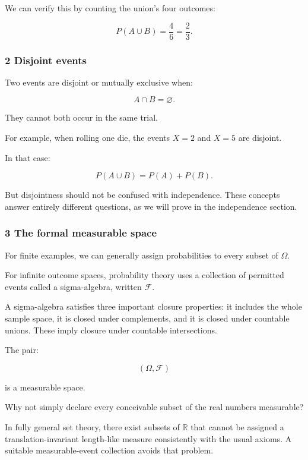 We can verify this by counting the union's four outcomes:

\[
 P(A\cup B)=\frac46=\frac23.
\]

\subsubsection{2 Disjoint events}\label{02-foundations-ii-ch023-disjoint-events}

\hypertarget{02-foundations-ii-ch023-disjoint-events}{}

Two events are disjoint or mutually exclusive when:

\[
 A\cap B=\varnothing.
\]

They cannot both occur in the same trial.

For example, when rolling one die, the events \(X=2\) and \(X=5\) are disjoint.

In that case:

\[
 P(A\cup B)=P(A)+P(B).
\]

But disjointness should not be confused with independence. These concepts answer entirely different questions, as we will prove in the independence section.

\subsubsection{3 The formal measurable space}\label{02-foundations-ii-ch023-the-formal-measurable-space}

\hypertarget{02-foundations-ii-ch023-the-formal-measurable-space}{}

For finite examples, we can generally assign probabilities to every subset of \(\Omega\).

For infinite outcome spaces, probability theory uses a collection of permitted events called a sigma-algebra, written \(\mathcal F\).

A sigma-algebra satisfies three important closure properties: it includes the whole sample space, it is closed under complements, and it is closed under countable unions. These imply closure under countable intersections.

The pair:

\[
 (\Omega,\mathcal F)
\]

is a measurable space.

Why not simply declare every conceivable subset of the real numbers measurable?

In fully general set theory, there exist subsets of \(\mathbb R\) that cannot be assigned a translation-invariant length-like measure consistently with the usual axioms. A suitable measurable-event collection avoids that problem.

